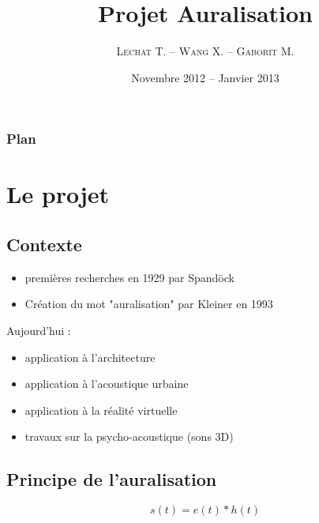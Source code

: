 \documentclass{beamer}
\title[Projet Auralisation]{Projet Auralisation}
\institute{L2 SPI TD2 -- Christophe Ayrault}
\author{\textsc{Lechat} T. -- \textsc{Wang} X. -- \textsc{Gaborit} M.}
\date{Novembre 2012 -- Janvier 2013\\\bigskip\scalebox{2}{\insertlogo}}
\begin{document}
\begin{frame}
\titlepage
\end{frame}

\begin{frame}
\frametitle{Plan}
\tableofcontents
\end{frame}

\section{Le projet}
\subsection{Contexte}

\begin{frame}

\begin{itemize}
    \item premières recherches en 1929 par Spandöck
    \item Création du mot "auralisation" par Kleiner en 1993
\end{itemize}

Aujourd'hui :

\begin{itemize}
    \item application à l'architecture
    \item application à l'acoustique urbaine
    \item application à la réalité virtuelle
    \item travaux sur la psycho-acoustique (sons 3D)
\end{itemize}

\end{frame}

\subsection{Principe de l'auralisation}

\begin{frame}

\begin{figure}
\end{figure}

\begin{equation*}
s(t) = e(t)\ast h(t)
\end{equation*}

\end{frame}
\end{document}
